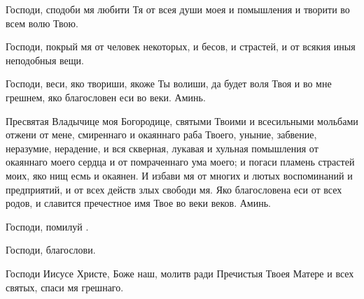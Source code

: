 \begin{mymulticols}
Господи, сподоби мя любити Тя от всея души моея и помышления и творити во всем волю Твою.

Господи, покрый мя от человек некоторых, и бесов, и страстей, и от всякия иныя неподобныя вещи.

Господи, веси, яко твориши, якоже Ты волиши, да будет воля Твоя и во мне грешнем, яко благословен еси во веки. Аминь.



Пресвятая Владычице моя Богородице, святыми Твоими и всесильными мольбами отжени от мене, смиреннаго и окаяннаго раба Твоего, уныние, забвение, неразумие, нерадение, и вся скверная, лукавая и хульная помышления от окаяннаго моего сердца и от помраченнаго ума моего; и погаси пламень страстей моих, яко нищ есмь и окаянен. И избави мя от многих и лютых воспоминаний и предприятий, и от всех действ злых свободи мя. Яко благословена еси от всех родов, и славится пречестное имя Твое во веки веков. Аминь.


\Chestneyshuyu

\slavainynen

Господи, помилуй .

Господи, благослови.




Господи Иисусе Христе, Боже наш, молитв ради Пречистыя Твоея Матере и всех святых, спаси мя грешнаго.




\end{mymulticols}

